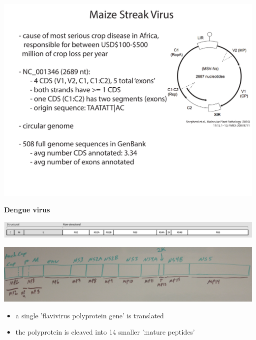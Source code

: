 \documentclass[landscape]{slides}
\begin{document}
\begin{slide}
\begin{center}

\includegraphics[width=10in]{figs/msv-slide}

\end{center}
\vfill
\end{slide}
\begin{slide}
\begin{center}
\textbf{Dengue virus}

\includegraphics[width=8in]{figs/dengue-genome-organization}

\includegraphics[width=8in]{figs/dengue-eneida}

\begin{itemize}
\item a single 'flavivirus polyprotein gene' is translated
\item the polyprotein is cleaved into 14 smaller 'mature peptides'
\end{itemize}

\end{center}
\vfill
\end{slide}
\end{document}
